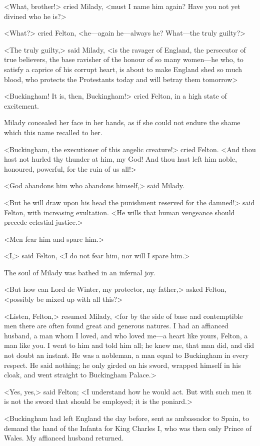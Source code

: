 <What, brother!> cried Milady, <must I name him again? Have you not yet divined who he is?> 

<What?> cried Felton, <he---again he---always he? What---the truly guilty?> 

<The truly guilty,> said Milady, <is the ravager of England, the persecutor of true believers, the base ravisher of the honour of so many women---he who, to satisfy a caprice of his corrupt heart, is about to make England shed so much blood, who protects the Protestants today and will betray them tomorrow\longdash> 

<Buckingham! It is, then, Buckingham!> cried Felton, in a high state of excitement. 

Milady concealed her face in her hands, as if she could not endure the shame which this name recalled to her. 

<Buckingham, the executioner of this angelic creature!> cried Felton. <And thou hast not hurled thy thunder at him, my God! And thou hast left him noble, honoured, powerful, for the ruin of us all!> 

<God abandons him who abandons himself,> said Milady. 

<But he will draw upon his head the punishment reserved for the damned!> said Felton, with increasing exultation. <He wills that human vengeance should precede celestial justice.> 

<Men fear him and spare him.> 

<I,> said Felton, <I do not fear him, nor will I spare him.> 

The soul of Milady was bathed in an infernal joy. 

<But how can Lord de Winter, my protector, my father,> asked Felton, <possibly be mixed up with all this?> 

<Listen, Felton,> resumed Milady, <for by the side of base and contemptible men there are often found great and generous natures. I had an affianced husband, a man whom I loved, and who loved me---a heart like yours, Felton, a man like you. I went to him and told him all; he knew me, that man did, and did not doubt an instant. He was a nobleman, a man equal to Buckingham in every respect. He said nothing; he only girded on his sword, wrapped himself in his cloak, and went straight to Buckingham Palace.>

<Yes, yes,> said Felton; <I understand how he would act. But with such men it is not the sword that should be employed; it is the poniard.> 

<Buckingham had left England the day before, sent as ambassador to Spain, to demand the hand of the Infanta for King Charles I, who was then only Prince of Wales. My affianced husband returned. 

